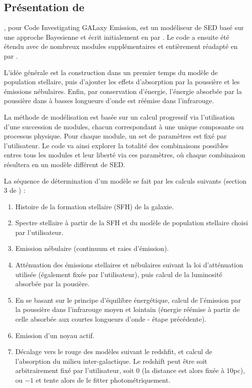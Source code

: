 \documentclass[../main/main.tex]{subfiles}
\begin{document}
\subsection{Présentation de }
\label{ssec:cigale}

, pour Code Investigating GALaxy Emission, est un modéliseur
de SED basé sur une approche Bayesienne et écrit initialement en  par \citet{Noll2009,Burgarella2005}. 
Le code a ensuite été étendu avec de nombreux modules
supplémentaires et
entièrement réadapté en  par \citet{Boquien2019}. 

L'idée générale est la construction dans un premier temps du modèle de
population stellaire, puis d'ajouter les effets d'absorption par la
poussière et les émissions nébulaires. Enfin, par conservation
d'énergie, l'énergie absorbée par la poussière dans à basses longueurs
d'onde est réémise dans l'infrarouge.

La méthode de modélisation est basée sur un calcul progressif via
l'utilisation d'une succession de modules,
chacun correspondant à une unique composante ou processus physique. Pour
chaque module, un set de paramètres est fixé par l'utilisateur. Le code
va ainsi explorer la totalité des combinaisons possibles entres
tous les modules et leur liberté via ces paramètres, où chaque
combinaison résultera en un modèle différent de SED.

La séquence de détermination d'un modèle se fait par les calculs suivants
(section 3 de \citet{Boquien2019}) :

\begin{enumerate}
\item Histoire de la formation stellaire (SFH) de la galaxie.
\item Spectre stellaire à partir de la SFH et du modèle de
  population stellaire choisi par l'utilisateur.
\item Emission nébulaire (continuum et raies d'émission).
\item Atténuation des émissions stellaires et nébulaires suivant la
    loi d'atténuation utilisée (également fixée par l'utilisateur), puis
    calcul de la luminosité absorbée par la pousière.
\item En se basant sur le principe d'équilibre énergétique, calcul de
    l'émission par la poussière dans l'infrarouge  moyen et lointain
    (énergie réémise à partir de celle absorbée aux courtes
    longueurs d'onde - étape précédente).
\item Emission d'un noyau actif.
\item Décalage vers le rouge des modèles suivant le redshfit, et calcul de l'absorption du
      milieu inter-galactique. Le redshift peut être soit  arbitrairement fixé
      par l'utilisateur, soit $0$ (la distance est alors fixée à
      $10$pc), ou $-1$ et  tente alors de le fitter photométriquement.
  
\end{enumerate}
\end{document}
